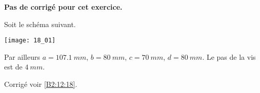 \normalfalse \difficilefalse \tdifficiletrue
\correctionfalse


\setcounter{numques}{0}


\ifcorrection
\else
\textbf{Pas de corrigé pour cet exercice.}
\fi

\ifprof
\else

Soit le schéma suivant. 
\begin{center}
\texttt{[image: 18\_01]}
\end{center}
\fi

Par ailleurs $a=\SI{107,1}{mm}$, $b=\SI{80}{mm}$, $c=\SI{70}{mm}$, $d=\SI{80}{mm}$. Le pas de la vis est de $\SI{4}{mm}$.


\ifprof
\else
\fi

\ifprof
\else
\fi


\ifprof
\else
\fi



\ifprof
\else
\begin{flushright}
\footnotesize{Corrigé  voir \ref{B2:12:18}.}
\end{flushright}%
\fi